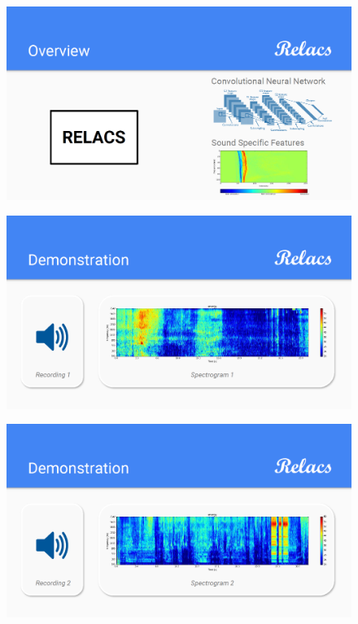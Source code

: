 \documentclass[a4paper]{article}
\begin{document}
\begin{figure}[h]
\centering
\includegraphics[width=\linewidth]{./Slide6}
\label{fig:Slide6}
\end{figure}

\begin{figure}[h]
\centering
\includegraphics[width=\linewidth]{./Slide7}
\label{fig:Slide7}
\end{figure}

\begin{figure}[h]
\centering
\includegraphics[width=\linewidth]{./Slide8}
\label{fig:Slide8}
\end{figure}
\end{document}
